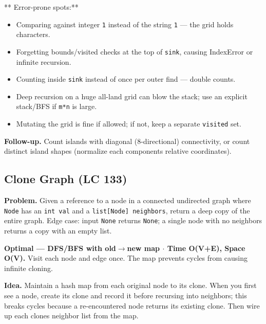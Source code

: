 \documentclass[11pt]{article}
\providecommand{\tightlist}{\setlength{\itemsep}{1pt}\setlength{\parskip}{0pt}}
\begin{document}
** Error-prone spots:**

\begin{itemize}
\tightlist
\item
  Comparing against integer \texttt{1} instead of the string \texttt{\textquotesingle{}1\textquotesingle{}} --- the grid holds characters.
\item
  Forgetting bounds/visited checks at the top of \texttt{sink}, causing IndexError or infinite recursion.
\item
  Counting inside \texttt{sink} instead of once per outer find --- double counts.
\item
  Deep recursion on a huge all-land grid can blow the stack; use an explicit stack/BFS if \texttt{m*n} is large.
\item
  Mutating the grid is fine if allowed; if not, keep a separate \texttt{visited} set.
\end{itemize}

\textbf{Follow-up.} Count islands with diagonal (8-directional) connectivity, or count distinct island shapes (normalize each component\textquotesingle s relative coordinates).

\subsection{Clone Graph (LC 133)}\label{clone-graph-lc-133}

\textbf{Problem.} Given a reference to a node in a connected undirected graph where \texttt{Node} has an \texttt{int\ val} and a \texttt{list{[}Node{]}\ neighbors}, return a deep copy of the entire graph. Edge case: input \texttt{None} returns \texttt{None}; a single node with no neighbors returns a copy with an empty list.

\textbf{Optimal --- DFS/BFS with old\(\rightarrow\)new map \(\cdot\) Time O(V+E), Space O(V).} Visit each node and edge once. The map prevents cycles from causing infinite cloning.

\textbf{Idea.} Maintain a hash map from each original node to its clone. When you first see a node, create its clone and record it before recursing into neighbors; this breaks cycles because a re-encountered node returns its existing clone. Then wire up each clone\textquotesingle s neighbor list from the map.

\end{document}
